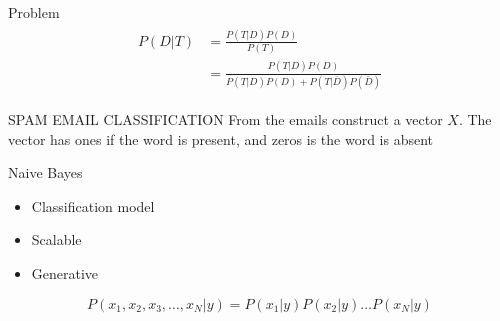 \documentclass{beamer}
\begin{document}
\begin{frame}{Problem}
    \begin{align}
    \label{eqn*:eqlabel}
        \begin{split}
            P(D|T) &= \frac{P(T|D)P(D)}{P(T)}\\
            &=\frac{P(T|D)P(D)}{P(T|D)P(D) + P(T|\bar{D})P(\bar{D})}
        \end{split}
    \end{align}


    
            
            
            
            
    

            
            
            
\end{frame}

\begin{frame}{SPAM EMAIL CLASSIFICATION}
    From the emails construct a vector $X$. The vector has ones if the word is present, and zeros is the word is absent\\
\end{frame}

\begin{frame}{Naive Bayes}
    \begin{itemize}
        \item Classification model
        \item Scalable
        \item Generative
    \end{itemize}
    
    \begin{equation*}
        P(x_{1},x_{2},x_{3},\dots,x_{N} \vert y) = P(x_{1}|y) P(x_{2}|y) \dots P(x_{N}|y)
    \end{equation*}
\end{frame}
\end{document}
